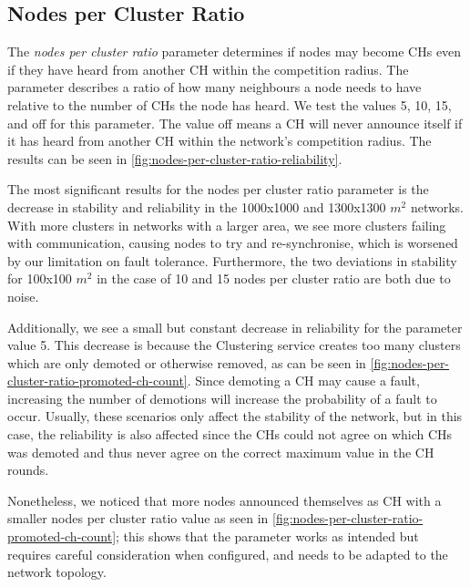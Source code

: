 \subsection{Nodes per Cluster Ratio}
\label{subsec:nodes-per-cluster-ratio}
The \emph{nodes per cluster ratio} parameter determines if nodes may become CHs even if they have heard from another CH within the competition radius. The parameter describes a ratio of how many neighbours a node needs to have relative to the number of CHs the node has heard. We test the values 5, 10, 15, and off for this parameter. The value off means a CH will never announce itself if it has heard from another CH within the network's competition radius. The results can be seen in \cref{fig:nodes-per-cluster-ratio-reliability}.

\begin{newtext}
The most significant results for the nodes per cluster ratio parameter is the decrease in stability and reliability in the 1000x1000 and 1300x1300 $m^2$ networks. With more clusters in networks with a larger area, we see more clusters failing with communication, causing nodes to try and re-synchronise, which is worsened by our limitation on fault tolerance. Furthermore, the two deviations in stability for 100x100 $m^2$ in the case of 10 and 15 nodes per cluster ratio are both due to noise.

Additionally, we see a small but constant decrease in reliability for the parameter value 5. This decrease is because the Clustering service creates too many clusters which are only demoted or otherwise removed, as can be seen in \cref{fig:nodes-per-cluster-ratio-promoted-ch-count}. Since demoting a CH may cause a fault, increasing the number of demotions will increase the probability of a fault to occur. Usually, these scenarios only affect the stability of the network, but in this case, the reliability is also affected since the CHs could not agree on which CHs was demoted and thus never agree on the correct maximum value in the CH rounds.

Nonetheless, we noticed that more nodes announced themselves as CH with a smaller nodes per cluster ratio value as seen in \cref{fig:nodes-per-cluster-ratio-promoted-ch-count}; this shows that the parameter works as intended but requires careful consideration when configured, and needs to be adapted to the network topology.

\end{newtext}

